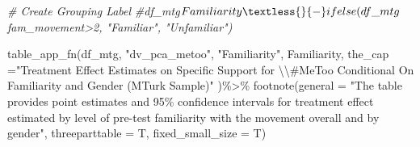 \documentclass[
]{article}
\newenvironment{Shaded}{\begin{snugshade}}{\end{snugshade}}
\newcommand{\AttributeTok}[1]{\textcolor[rgb]{0.77,0.63,0.00}{#1}}
\newcommand{\CommentTok}[1]{\textcolor[rgb]{0.56,0.35,0.01}{\textit{#1}}}
\newcommand{\FunctionTok}[1]{\textcolor[rgb]{0.00,0.00,0.00}{#1}}
\newcommand{\NormalTok}[1]{#1}
\newcommand{\SpecialCharTok}[1]{\textcolor[rgb]{0.00,0.00,0.00}{#1}}
\newcommand{\StringTok}[1]{\textcolor[rgb]{0.31,0.60,0.02}{#1}}
\begin{document}
\begin{Shaded}
\begin{Highlighting}[]
\CommentTok{\# Create Grouping Label }
\CommentTok{\#df\_mtg$Familiarity \textless{}{-} ifelse(df\_mtg$fam\_movement\textgreater{}2, "Familiar", "Unfamiliar")}

\FunctionTok{table\_app\_fn}\NormalTok{(df\_mtg, }\StringTok{"dv\_pca\_metoo"}\NormalTok{,}
         \StringTok{"Familiarity"}\NormalTok{,}
\NormalTok{         Familiarity,}
         \AttributeTok{the\_cap =}\StringTok{"Treatment Effect Estimates on Specific Support for }\SpecialCharTok{\textbackslash{}\textbackslash{}}\StringTok{\#MeToo Conditional On Familiarity and Gender (MTurk Sample)"}\NormalTok{ )}\SpecialCharTok{\%\textgreater{}\%}
  \FunctionTok{footnote}\NormalTok{(}\AttributeTok{general =} \StringTok{"The table provides point estimates and 95\% confidence intervals for treatment effect estimated by level of pre{-}test familiarity with the movement overall and by gender"}\NormalTok{,}
           \AttributeTok{threeparttable =}\NormalTok{ T,}
           \AttributeTok{fixed\_small\_size =}\NormalTok{ T)}
\end{Highlighting}
\end{Shaded}
\end{document}
